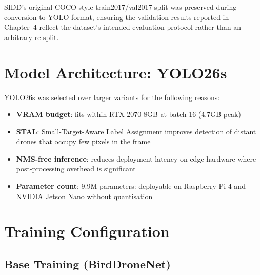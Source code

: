 \documentclass[12pt,a4paper]{report}
\begin{document}
SIDD's original COCO-style train2017/val2017 split was preserved during
conversion to YOLO format, ensuring the validation results reported in
Chapter~4 reflect the dataset's intended evaluation protocol rather than
an arbitrary re-split.

\section{Model Architecture: YOLO26s}

YOLO26s was selected over larger variants for the following reasons:

\begin{itemize}
  \item \textbf{VRAM budget}: fits within RTX 2070 8GB at batch 16 (4.7GB peak)
  \item \textbf{STAL}: Small-Target-Aware Label Assignment improves detection
        of distant drones that occupy few pixels in the frame
  \item \textbf{NMS-free inference}: reduces deployment latency on edge hardware
        where post-processing overhead is significant
  \item \textbf{Parameter count}: 9.9M parameters: deployable on Raspberry Pi 4
        and NVIDIA Jetson Nano without quantisation
\end{itemize}

\section{Training Configuration}
\label{sec:training_config}

\subsection{Base Training (BirdDroneNet)}
\end{document}
